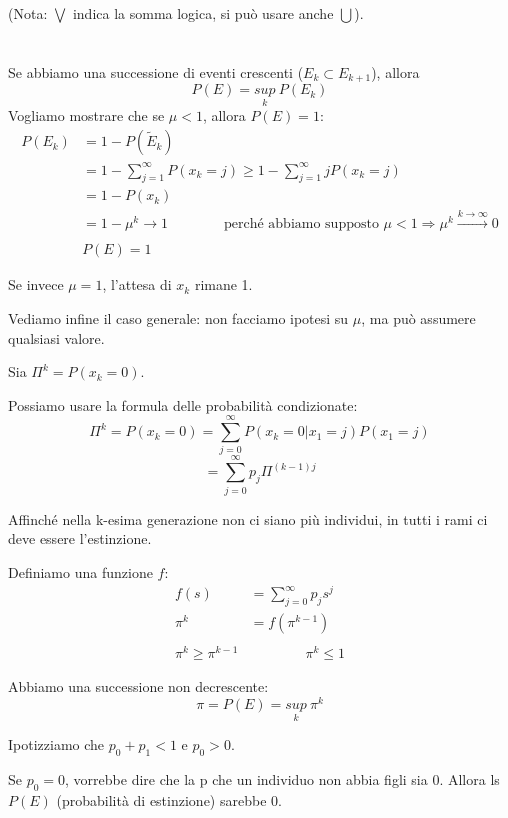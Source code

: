 \documentclass[a4paper,12pt]{book}
\begin{document}
(Nota: $\bigvee$ indica la somma logica, si può usare anche $\bigcup$).
\\
\\
\\
Se abbiamo una successione di eventi crescenti ($ E_k \subset E_{k+1} $), allora
$$ P(E) = \underset{k}{sup} \: P(E_k)$$
Vogliamo mostrare che se $\mu < 1$, allora $ P(E) = 1 $:
\begin{align*}
	P(E_k) & = 1 - P(\tilde{E}_k) \\
	& = 1 - \sum_{j=1}^{\infty}P(x_k = j) \ge 1 - \sum_{j=1}^{\infty}jP(x_k=j) \\
	& = 1 - P(x_k) \\
	& = 1-\mu^k \to 1 \qquad \qquad \text{perché abbiamo supposto } \mu < 1 \Rightarrow \mu^k \stackrel{k \to \infty}{\longrightarrow} 0 \\ \\
	& P(E) = 1
\end{align*}

Se invece $\mu = 1$, l'attesa di $ x_k $ rimane 1.

Vediamo infine il caso generale: non facciamo ipotesi su $\mu$, ma può assumere qualsiasi valore.

Sia $ \Pi^k = P(x_k = 0) $.

Possiamo usare la formula delle probabilità condizionate:
$$ \Pi^k = P(x_k = 0) = \sum_{j=0}^{\infty} P(x_k = 0 | x_1 = j) P(x_1 = j) $$
$$ = \sum_{j=0}^{\infty} p_j\Pi^{(k-1)j} $$  %

Affinché nella k-esima generazione non ci siano più individui, in tutti i rami ci deve essere l'estinzione. 

Definiamo una funzione $ f $:
\begin{align*}
	f(s) & = \sum_{j=0}^{\infty} p_j s^j \\
	\pi^k & = f(\pi^{k-1}) \\
	\\
	\pi^k \ge \pi^{k-1} & \qquad \qquad \pi^k \le 1 
\end{align*}

Abbiamo una successione non decrescente:
$$ \pi = P(E) = \underset{k}{sup} \: \pi^k $$

Ipotizziamo che $ p_0 + p_1 < 1 $ e $ p_0 > 0 $.

Se $ p_0 = 0$, vorrebbe dire che la p che un individuo non abbia figli sia 0. Allora ls $ P(E) $ (probabilità di estinzione) sarebbe 0. 
\end{document}
